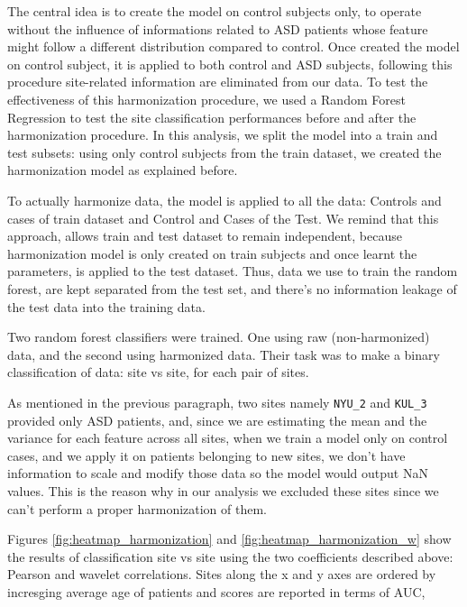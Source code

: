 \documentclass[11pt]{report}
\begin{document}
The central idea is to create the model on control subjects only, to operate without the influence of informations related to ASD patients whose feature might follow a different distribution compared to control.
Once created the model on control subject, it is applied to both control and ASD subjects, following this procedure site-related information are eliminated from our data.
To test the effectiveness of this harmonization procedure, we used a Random Forest Regression to test the site classification performances before and after the harmonization procedure.
In this analysis, we split the model into a train and test subsets: using only control subjects from the train dataset, we created the harmonization model as explained before.

To actually harmonize data, the model is applied to all the data: Controls and cases of train dataset and Control and Cases of the Test.
We remind that this approach, allows train and test dataset to remain independent, because harmonization model is only created on train subjects and once learnt the parameters, is applied to the test dataset. Thus, data we use to train the random forest, are kept separated from the test set, and there's no information leakage of the test data into the training data.

Two random forest classifiers were trained. One using raw (non-harmonized) data, and the second using harmonized data.
Their task was to make a binary classification of data: site vs site, for each pair of sites.


\begin{notes}
\item As mentioned in the previous paragraph, two sites namely \texttt{NYU\_2} and \texttt{KUL\_3} provided only ASD patients, and, since we are estimating the mean and the variance for each feature across all sites, when we train a model only on control cases, and we apply it on patients belonging to new sites, we don't have information to scale and modify those data so the model would output NaN values.
This is the reason why in our analysis we excluded these sites since we can't perform a proper harmonization of them.
\end{notes}

Figures \ref{fig:heatmap_harmonization} and \ref{fig:heatmap_harmonization_w} show the results of classification site vs site using the two coefficients described above:  Pearson and wavelet correlations. Sites along the x and y axes are ordered by incresging average age of patients and scores are reported in terms of AUC,
\end{document}
